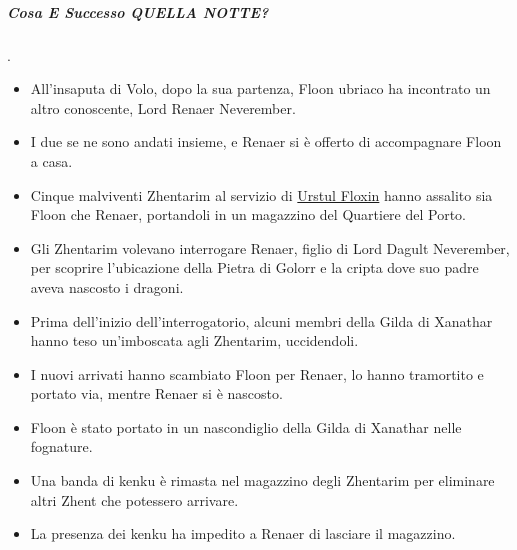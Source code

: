 \documentclass{article}
\begin{document}
                        \subparagraph{Cosa E Successo QUELLA NOTTE?} .
                        \begin{itemize}
                            \item All’insaputa di Volo, dopo la sua partenza, Floon ubriaco ha incontrato un altro conoscente, Lord Renaer Neverember.
                            \item I due se ne sono andati insieme, e Renaer si è offerto di accompagnare Floon a casa.
                            \item Cinque malviventi Zhentarim al servizio di \hyperlink{urstul}{Urstul Floxin} hanno assalito sia Floon che Renaer, portandoli in un magazzino del Quartiere del Porto.
                            \item Gli Zhentarim volevano interrogare Renaer, figlio di Lord Dagult Neverember, per scoprire l’ubicazione della Pietra di Golorr e la cripta dove suo padre aveva nascosto i dragoni.
                            \item Prima dell'inizio dell'interrogatorio, alcuni membri della Gilda di Xanathar hanno teso un'imboscata agli Zhentarim, uccidendoli.
                            \item I nuovi arrivati hanno scambiato Floon per Renaer, lo hanno tramortito e portato via, mentre Renaer si è nascosto.
                            \item Floon è stato portato in un nascondiglio della Gilda di Xanathar nelle fognature.
                            \item Una banda di kenku è rimasta nel magazzino degli Zhentarim per eliminare altri Zhent che potessero arrivare.
                            \item La presenza dei kenku ha impedito a Renaer di lasciare il magazzino.
                        \end{itemize}
                        
               
\end{document}
